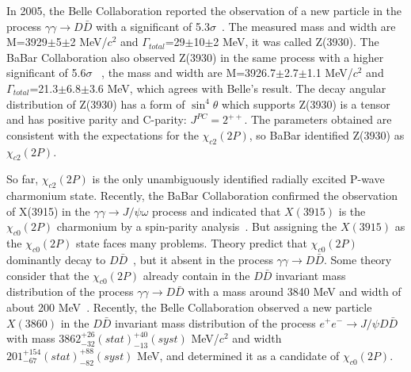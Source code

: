 \documentclass[aps,preprint,tightenlines,superscriptaddress,showpacs,byrevtex,amsmath,amssymb,nofloatfix]{revtex4}
\begin{document}
In 2005, the Belle Collaboration reported the observation of a new particle in the process $\gamma\gamma\rightarrow D\bar{D}$ with a significant of 5.3$\sigma$~\cite{Belle_3930}. The measured mass and width are M=3929$\pm$5$\pm$2 MeV/$c^{2}$ and  $\Gamma_{total}$=29$\pm$10$\pm$2 MeV, it was called Z(3930). The BaBar Collaboration also observed Z(3930) in the same process with a higher significant of 5.6$\sigma$ ~\cite{BaBar_3930}, the mass and width are M=3926.7$\pm$2.7$\pm$1.1 MeV/$c^{2}$ and  $\Gamma_{total}$=21.3$\pm$6.8$\pm$3.6 MeV, which agrees with Belle's result. The decay angular distribution of Z(3930) has a form of $\sin^{4}\theta$ which supports Z(3930) is a tensor and has  positive parity and C-parity: $J^{PC}=2^{++}$. The parameters obtained are consistent with the expectations for the $\chi_{c2} (2P)$, so BaBar identified Z(3930) as $\chi_{c2} (2P)$.

So far, $\chi_{c2} (2P)$ is the only unambiguously identified radially excited P-wave charmonium state. Recently, the BaBar Collaboration confirmed the observation of X(3915) in the $\gamma \gamma \to J/\psi \omega$ process and indicated that $X(3915)$ is the $\chi_{c0}(2P)$ charmonium by a spin-parity analysis~\cite{BaBar_3915}. But assigning the $X(3915)$ as the $\chi_{c0}(2P)$ state faces many problems. Theory predict that $\chi_{c0} (2P)$ dominantly decay to $D\bar{D}$~\cite{Highercharmonia}, but it absent in the process $\gamma\gamma\rightarrow D\bar{D}$. Some theory consider that the $\chi_{c0} (2P)$ already contain in the $D\bar{D}$ invariant mass distribution of the process $\gamma\gamma\rightarrow D\bar{D}$ with a mass around 3840 MeV and width of about 200 MeV~\cite{chic02ptheory1}. Recently, the Belle Collaboration observed a new particle $X(3860)$ in the $D\bar{D}$  invariant mass distribution of the process $e^{+}e^{-}\rightarrow J/\psi D\bar{D}$ with  mass $3862^{+26}_{-32}(stat)^{+40}_{-13}(syst)$ MeV/$c^{2}$ and width $201^{+154}_{-67}(stat)^{+88}_{-82}(syst)$ MeV, and determined it as a candidate of $\chi_{c0}(2P)$.

\end{document}
